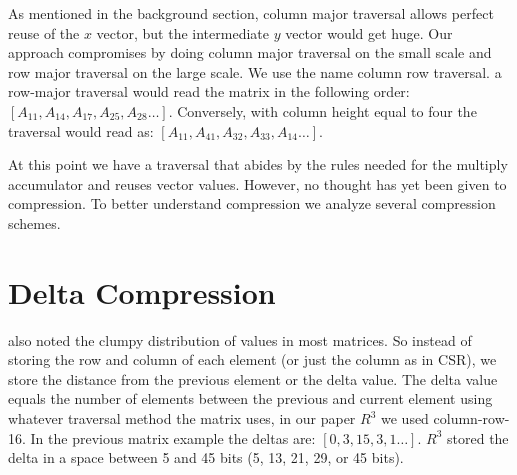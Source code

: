 As mentioned in the background section, column major traversal allows perfect reuse of the $x$ vector, but the intermediate $y$ vector would get huge. Our approach compromises by doing column major traversal on the small scale and row major traversal on the large scale. We use the name column row traversal. 
a row-major traversal would read the matrix in the following order: $[A_{11}, A_{14}, A_{17}, A_{25}, A_{28} \dots]$. Conversely, with column height equal to four the traversal would read as: $[A_{11}, A_{41}, A_{32}, A_{33}, A_{14} \dots]$. 
\par At this point we have a traversal that abides by the rules needed for the multiply accumulator and reuses vector values. However, no thought has yet been given to compression. To better understand compression we analyze several compression schemes.
\indent
\section{Delta Compression}
\cite{prelim:Kourtis} also noted the clumpy distribution of values in most matrices. So instead of storing the row and column of each element (or just the column as in CSR), we store the distance from the previous element or the delta value. The delta value equals the number of elements between the previous and current element using whatever traversal method the matrix uses, in our paper $R^3$ we used column-row-16. In the previous matrix example the deltas are: $[0, 3, 15, 3, 1 \dots]$. $R^3$ stored the delta in a space between 5 and 45 bits (5, 13, 21, 29, or 45 bits).
